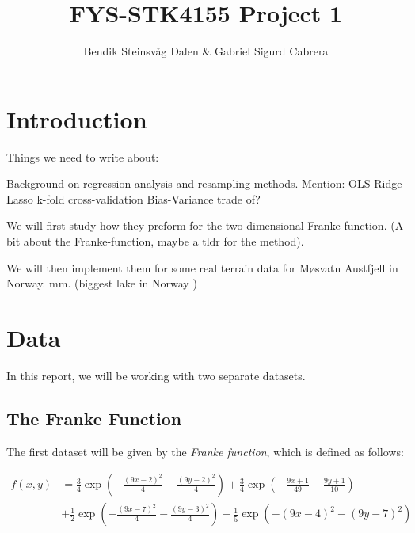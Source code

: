 \documentclass[a4paper,10pt,english]{article}
\begin{document}

\title{FYS-STK4155 Project 1}
\author{Bendik Steinsvåg Dalen \& Gabriel Sigurd Cabrera}
\maketitle

\begin{abstract}

\end{abstract}

\section{Introduction}
\label{sec:introduction}

Things we need to write about:

Background on regression analysis and resampling methods.
Mention:
	OLS
	Ridge
	Lasso
	k-fold cross-validation
	Bias-Variance trade of?

We will first study how they preform for the two dimensional Franke-function. (A bit about the Franke-function, maybe a tldr for the method).

We will then implement them for some real terrain data for Møsvatn Austfjell in Norway. mm. (biggest lake in Norway ) %





\section{Data}
\label{sec:data}

In this report, we will be working with two separate datasets.

\subsection{The Franke Function}

The first dataset will be given by the \textit{Franke function}, which is defined as follows:

\begin{align*}
f(x,y) &= \frac{3}{4} \exp \left( -\frac{(9x-2)^2}{4} -\frac{(9y-2)^2}{4} \right) + \frac{3}{4} \exp \left( -\frac{9x+1}{49} -\frac{9y+1}{10} \right) \\ &+ \frac{1}{2} \exp \left( -\frac{(9x-7)^2}{4} -\frac{(9y-3)^2}{4} \right) - \frac{1}{5} \exp \left( -(9x-4)^2 - (9y-7)^2 \right)
\end{align*}
\end{document}
